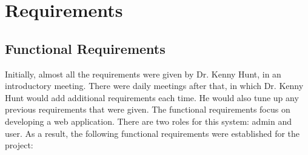 \section{Requirements}
\label{sec:Requirements}

\subsection{Functional Requirements}
Initially, almost all the requirements were given by Dr. Kenny Hunt, in an introductory meeting. There were daily meetings after that, in which Dr. Kenny Hunt would add additional requirements each time. He would also tune up any previous requirements that were given. The functional requirements focus on developing a web application. There are two roles for this system: admin and user. As a result, the following functional requirements were established for the project:
